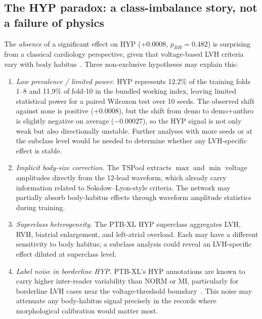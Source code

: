 \documentclass[mathematics,article,submit,pdftex]{Definitions/mdpi}
\def\texttt#1{#1}%
\def\mathrm#1{#1}%
\begin{document}
\subsection{The HYP paradox: a class-imbalance story, not a failure of physics}
The \emph{absence} of a significant effect on HYP ($+0.0008$, $p_{\mathrm{BH}}{=}0.482$) is surprising from a classical cardiology perspective, given that voltage-based LVH criteria vary with body habitus~\cite{MacFarlane2011}. Three non-exclusive hypotheses may explain this:
\begin{enumerate}[leftmargin=1.4em]
    \item \emph{Low prevalence / limited power.} HYP represents 12.2\% of the training folds 1--8 and 11.9\% of fold-10 in the bundled working index, leaving limited statistical power for a paired Wilcoxon test over 10 seeds. The observed shift against \texttt{none} is positive ($+0.0008$), but the shift from \texttt{demo} to \texttt{demo+anthro} is slightly negative on average ($-0.00027$), so the HYP signal is not only weak but also directionally unstable. Further analyses with more seeds or at the subclass level would be needed to determine whether any LVH-specific effect is stable.
    \item \emph{Implicit body-size correction.} The TSPool extracts $\max$ and $\min$ voltage amplitudes directly from the 12-lead waveform, which already carry information related to Sokolow--Lyon-style criteria. The network may partially absorb body-habitus effects through waveform amplitude statistics during training.
    \item \emph{Superclass heterogeneity.} The PTB-XL HYP superclass aggregates LVH, RVH, biatrial enlargement, and left-atrial overload. Each may have a different sensitivity to body habitus; a subclass analysis could reveal an LVH-specific effect diluted at superclass level.
    \item \emph{Label noise in borderline HYP.} PTB-XL's HYP annotations are known to carry higher inter-reader variability than NORM or MI, particularly for borderline LVH cases near the voltage-threshold boundary~\cite{Wagner2020}. This noise may attenuate any body-habitus signal precisely in the records where morphological calibration would matter most.
\end{enumerate}
\end{document}
